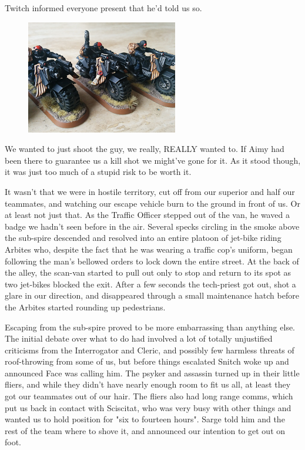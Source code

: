 Twitch informed everyone present that he'd told us so.

\begin{figure}
	\begin{center}
		\includegraphics[width=\figwidth]{pics/18/37.png}
	\end{center}
\end{figure}
We wanted to just shoot the guy, we really, REALLY wanted to. 
If Aimy had been there to guarantee us a kill shot we might've gone for it. 
As it stood though, it was just too much of a stupid risk to be worth it. 


It wasn't that we were in hostile territory, cut off from our superior and half our teammates, and watching our escape vehicle burn to the ground in front of us. 
Or at least not just that. 
As the Traffic Officer stepped out of the van, he waved a badge we hadn't seen before in the air. 
Several specks circling in the smoke above the sub-spire descended and resolved into an entire platoon of jet-bike riding Arbites who, despite the fact that he was wearing a traffic cop's uniform, began following the man's bellowed orders to lock down the entire street. 
At the back of the alley, the scan-van started to pull out only to stop and return to its spot as two jet-bikes blocked the exit. 
After a few seconds the tech-priest got out, shot a glare in our direction, and disappeared through a small maintenance hatch before the Arbites started rounding up pedestrians.

Escaping from the sub-spire proved to be more embarrassing than anything else. 
The initial debate over what to do had involved a lot of totally unjustified criticisms from the Interrogator and Cleric, and possibly few harmless threats of roof-throwing from some of us, but before things escalated Snitch woke up and announced Face was calling him. 
The psyker and assassin turned up in their little fliers, and while they didn't have nearly enough room to fit us all, at least they got our teammates out of our hair. 
The fliers also had long range comms, which put us back in contact with Sciscitat, who was very busy with other things and wanted us to hold position for "six to fourteen hours". 
Sarge told him and the rest of the team where to shove it, and announced our intention to get out on foot.

